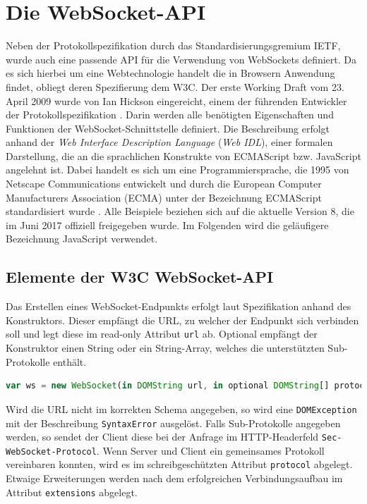 \documentclass[11pt,a4paper,titlepage]{scrartcl}
\numberwithin{equation}{section}
\begin{document}
\section{Die WebSocket-API}\label{sec:WebSocketAPI}
Neben der Protokollspezifikation durch das Standardisierungsgremium IETF, wurde auch eine passende API für die Verwendung von WebSockets definiert. Da es sich hierbei um eine Webtechnologie handelt die in Browsern Anwendung findet, obliegt deren Spezifierung dem W3C. Der erste Working Draft vom 23. April 2009 wurde von Ian Hickson eingereicht, einem der führenden Entwickler der Protokollspezifikation \autocite{hickson_web_2009}. Darin werden alle benötigten Eigenschaften und Funktionen der WebSocket-Schnittstelle definiert. Die Beschreibung erfolgt anhand der \textit{Web Interface Description Language} (\textit{Web IDL}), einer formalen Darstellung, die an die sprachlichen Konstrukte von ECMAScript bzw. JavaScript angelehnt ist. Dabei handelt es sich um eine Programmiersprache, die 1995 von Netscape Communications entwickelt und durch die European Computer Manufacturers Association (ECMA) unter der Bezeichnung ECMAScript standardisiert wurde \autocite{peyrott_brief_2017}. Alle Beispiele beziehen sich auf die aktuelle Version 8, die im Juni 2017 offiziell freigegeben wurde. Im Folgenden wird die geläufigere Bezeichnung JavaScript verwendet.

\subsection{Elemente der W3C WebSocket-API}
Das Erstellen eines WebSocket-Endpunkts erfolgt laut Spezifikation anhand des Konstruktors. Dieser empfängt die URL, zu welcher der Endpunkt sich verbinden soll und legt diese im read-only Attribut \texttt{url} ab. Optional empfängt der Konstruktor einen String oder ein String-Array, welches die unterstützten Sub-Protokolle enthält. \bigskip

\begin{lstlisting}[frame=single, language=JavaScript, caption=WebSocket anlegen und verbinden]
	var ws = new WebSocket(in DOMString url, in optional DOMString[] protocols);
\end{lstlisting}

\noindent Wird die URL nicht im korrekten Schema angegeben, so wird eine \texttt{DOMException} mit der Beschreibung \texttt{SyntaxError} ausgelöst. Falls Sub-Protokolle angegeben werden, so sendet der Client diese bei der Anfrage im HTTP-Headerfeld \texttt{Sec-WebSocket-Protocol}. Wenn Server und Client ein gemeinsames Protokoll vereinbaren konnten, wird es im schreibgeschützten Attribut \texttt{protocol} abgelegt. Etwaige Erweiterungen werden nach dem erfolgreichen Verbindungsaufbau im Attribut \texttt{extensions} abgelegt.
\end{document}
